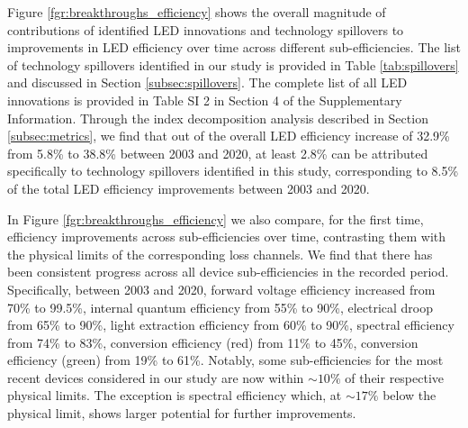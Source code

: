 \documentclass[twoside,twocolumn,9pt]{article}
\begin{document}
Figure \ref{fgr:breakthroughs_efficiency} shows the overall magnitude of contributions of identified LED innovations and technology spillovers to improvements in LED efficiency over time across different sub-efficiencies. The list of technology spillovers identified in our study is provided in Table \ref{tab:spillovers} and discussed in Section \ref{subsec:spillovers}. The complete list of all LED innovations is provided in Table SI 2 in Section 4 of the Supplementary Information. Through the index decomposition analysis described in Section \ref{subsec:metrics}, we find that out of the overall LED efficiency increase of 32.9\% from 5.8\% to 38.8\% between 2003 and 2020, at least 2.8\% can be attributed specifically to technology spillovers identified in this study, corresponding to 8.5\% of the total LED efficiency improvements between 2003 and 2020.

In Figure \ref{fgr:breakthroughs_efficiency} we also compare, for the first time, efficiency improvements across sub-efficiencies over time, contrasting them with the physical limits of the corresponding loss channels. We find that there has been consistent progress across all device sub-efficiencies in the recorded period. Specifically, between 2003 and 2020, forward voltage efficiency increased from 70\% to 99.5\%, internal quantum efficiency from 55\% to 90\%, electrical droop from 65\% to 90\%, light extraction efficiency from 60\% to 90\%, spectral efficiency from 74\% to 83\%, conversion efficiency (red) from 11\% to 45\%, conversion efficiency (green) from 19\% to 61\%. Notably, some sub-efficiencies for the most recent devices considered in our study are now within $\sim10\%$ of their respective physical limits. The exception is spectral efficiency which, at $\sim17\%$ below the physical limit, shows larger potential for further improvements. 
\end{document}
